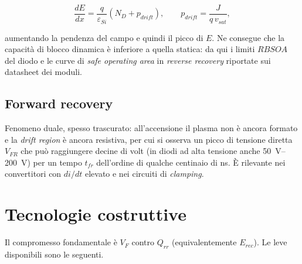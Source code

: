\begin{equation}
\frac{dE}{dx} = \frac{q}{\varepsilon_{Si}}\left(N_D + p_{drift}\right),
\qquad p_{drift} = \frac{J}{q\, v_{sat}} ,
\end{equation}

aumentando la pendenza del campo e quindi il picco di $E$. Ne consegue che la
capacità di blocco dinamica è inferiore a quella statica: da qui i limiti
$RBSOA$ del diodo e le curve di \emph{safe operating area} in
\emph{reverse recovery} riportate sui datasheet dei moduli.

\subsection{Forward recovery}

Fenomeno duale, spesso trascurato: all'accensione il plasma non è ancora
formato e la \emph{drift region} è ancora resistiva, per cui si osserva un picco
di tensione diretta $V_{FR}$ che può raggiungere decine di volt (in diodi ad
alta tensione anche \SIrange{50}{200}{\volt}) per un tempo $t_{fr}$ dell'ordine
di qualche centinaio di \si{\nano\second}. È rilevante nei convertitori con
$di/dt$ elevato e nei circuiti di \emph{clamping}.

\section{Tecnologie costruttive}

Il compromesso fondamentale è $V_F$ contro $Q_{rr}$ (equivalentemente
$E_{rec}$). Le leve disponibili sono le seguenti.

